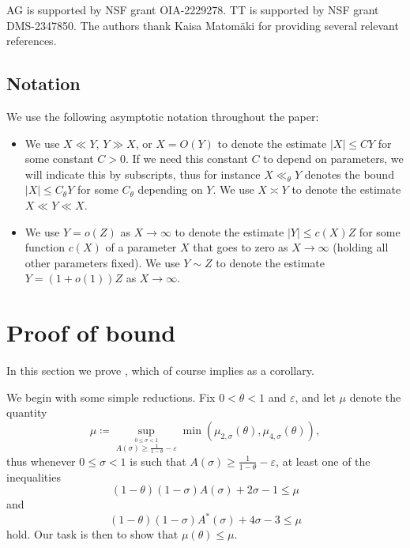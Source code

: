 \documentclass[12pt]{amsart}
\newcommand{\eps}{\varepsilon}
\begin{document}
AG is supported by NSF grant OIA-2229278. TT is supported by NSF grant DMS-2347850. The authors thank Kaisa Matom\"aki for providing several relevant references.


\subsection{Notation}\label{notation-sec}

We use the following asymptotic notation throughout the paper:

\begin{itemize}
\item We use $X \ll Y$, $Y \gg X$, or $X = O(Y)$ to denote the estimate $|X| \leq C Y$ for some constant $C>0$.  If we need this constant $C$ to depend on parameters, we will indicate this by subscripts, thus for instance $X \ll_\theta Y$ denotes the bound $|X| \leq C_\theta Y$ for some $C_\theta$ depending on $Y$.  We use $X \asymp Y$ to denote the estimate $X \ll Y \ll X$.
\item We use $Y = o(Z)$ as $X \to \infty$ to denote the estimate $|Y| \leq c(X) Z$ for some function $c(X)$ of a parameter $X$ that goes to zero as $X \to \infty$ (holding all other parameters fixed).  We use $Y \sim Z$ to denote the estimate $Y = (1+o(1)) Z$ as $X \to \infty$.
\end{itemize}

\section{Proof of bound}\label{proof-sec}

In this section we prove , which of course implies  as a corollary.

We begin with some simple reductions.
Fix $0 <\theta < 1$ and $\eps$, and let $\mu$ denote the quantity
$$ \mu \coloneqq \sup_{\stackrel{0 \leq \sigma < 1}{A(\sigma) \geq \frac{1}{1-\theta}-\eps}} \min( \mu_{2,\sigma}(\theta), \mu_{4,\sigma}(\theta)),$$
thus
whenever $0 \leq \sigma < 1$ is such that $A(\sigma) \geq \frac{1}{1-\theta}-\eps$, at least one of the inequalities
\begin{equation}\label{muth-alt}
(1-\theta)(1-\sigma) A(\sigma) + 2\sigma - 1 \leq \mu
\end{equation}
and
\begin{equation}\label{muth-alt-2}
(1-\theta)(1-\sigma) A^*(\sigma) + 4\sigma - 3 \leq \mu
\end{equation}
hold. Our task is then to show that $\mu(\theta) \leq \mu$.
\end{document}
